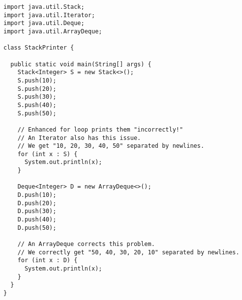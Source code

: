 \begin{cl}[]{}
\begin{lstlisting}[language=MyJava]
import java.util.Stack;
import java.util.Iterator;
import java.util.Deque;
import java.util.ArrayDeque;

class StackPrinter {

  public static void main(String[] args) {
    Stack<Integer> S = new Stack<>();
    S.push(10); 
    S.push(20); 
    S.push(30); 
    S.push(40); 
    S.push(50);

    // Enhanced for loop prints them "incorrectly!"
    // An Iterator also has this issue.
    // We get "10, 20, 30, 40, 50" separated by newlines.
    for (int x : S) { 
      System.out.println(x); 
    }

    Deque<Integer> D = new ArrayDeque<>();
    D.push(10); 
    D.push(20); 
    D.push(30); 
    D.push(40); 
    D.push(50);    

    // An ArrayDeque corrects this problem.
    // We correctly get "50, 40, 30, 20, 10" separated by newlines.
    for (int x : D) { 
      System.out.println(x); 
    }
  }
}
\end{lstlisting}
\end{cl}


